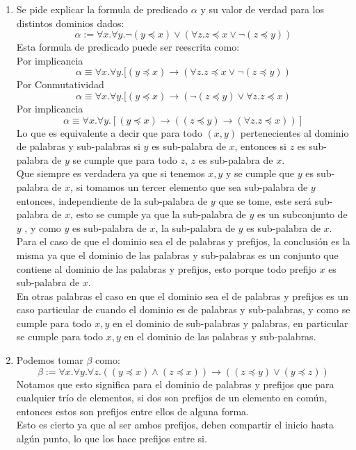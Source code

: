 \documentclass[letter]{article}
\begin{document}
	
	\begin{pregunta}{1} %
		\begin{enumerate}
		\item Se pide explicar la formula de predicado $\alpha$ y su valor de verdad para los distintos dominios dados:
		$$\alpha := \forall x.\forall y. \neg (y \preceq x)\vee (\forall z. z\preceq x\vee \neg (z\preceq y)) $$
		Esta formula de predicado puede ser reescrita como:\\
		
		Por implicancia
		\begin{equation}
		\alpha\equiv \forall x.\forall y. [(y\preceq x)\rightarrow(\forall z. z\preceq x\vee \neg (z\preceq y))
		\end{equation}
		Por Conmutatividad
		\begin{equation}
		\alpha\equiv \forall x.\forall y. [(y\preceq x)\rightarrow(\neg (z\preceq y)\vee\forall z. z\preceq x)
		\end{equation}  
		Por implicancia
		\begin{equation}				
		\alpha\equiv \forall x.\forall y. [(y\preceq x)\rightarrow ((z\preceq y) \rightarrow (\forall z. z\preceq x))]
		\end{equation}
		Lo que es equivalente a decir que para todo $(x,y)$ pertenecientes al dominio de palabras y sub-palabras si $y$ es sub-palabra de $x$, entonces si $z$ es sub-palabra de $y$ se cumple que para todo $z$, $z$ es sub-palabra de $x$.\\
		Que siempre es verdadera ya que si tenemos $x,y$ y se cumple que $y$ es sub-palabra de $x$, si tomamos un tercer elemento que sea sub-palabra de $y$ entonces, independiente de la sub-palabra de $y$ que se tome, este será sub-palabra de $x$, esto se cumple ya que la sub-palabra de $y$ es un subconjunto de $y$ , y como $y$ es sub-palabra de $x$, la sub-palabra de $y$ es sub-palabra de $x$.\\
		
		Para el caso de que el dominio sea el de palabras y prefijos, la conclusión es la misma ya que el dominio de las palabras y sub-palabras es un conjunto que contiene al dominio de las palabras y prefijos, esto porque todo prefijo $x$ es sub-palabra de $x$.\\
		En otras palabras el caso en que el dominio sea el de palabras y prefijos es un caso particular de cuando el dominio es de palabras y sub-palabras, y como se cumple para todo $x,y$ en el dominio de sub-palabras y palabras, en particular se cumple para todo $x,y$ en el dominio de las palabras y sub-palabras.
		\item Podemos tomar $\beta$ como:
		$$\beta :=\forall x. \forall y. \forall z. ((y\preceq x)\wedge(z\preceq x))\rightarrow ((z\preceq y)\vee(y\preceq z)) $$
		Notamos que esto significa para el dominio de palabras y prefijos que para cualquier trío de elementos, si dos son prefijos de un elemento en común, entonces estos son prefijos entre ellos de alguna forma.\\
		Esto es cierto ya que al ser ambos prefijos, deben compartir el inicio hasta algún punto, lo que los hace prefijos entre si.\\
		

\end{enumerate}
\end{pregunta}
\end{document}
